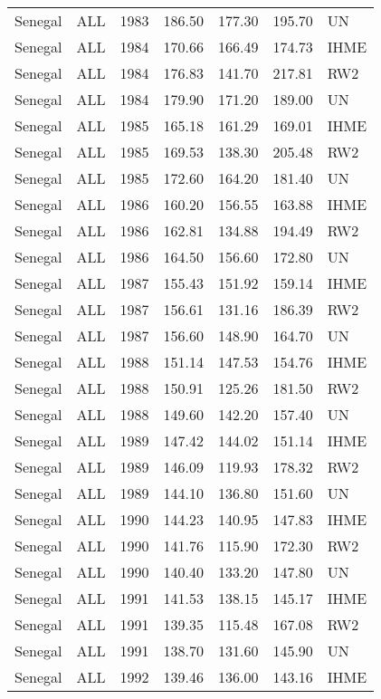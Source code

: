 \begin{longtable}{lllrrrl}
  Senegal & ALL & 1983 & 186.50 & 177.30 & 195.70 & UN \\ 
  Senegal & ALL & 1984 & 170.66 & 166.49 & 174.73 & IHME \\ 
  Senegal & ALL & 1984 & 176.83 & 141.70 & 217.81 & RW2 \\ 
  Senegal & ALL & 1984 & 179.90 & 171.20 & 189.00 & UN \\ 
  Senegal & ALL & 1985 & 165.18 & 161.29 & 169.01 & IHME \\ 
  Senegal & ALL & 1985 & 169.53 & 138.30 & 205.48 & RW2 \\ 
  Senegal & ALL & 1985 & 172.60 & 164.20 & 181.40 & UN \\ 
  Senegal & ALL & 1986 & 160.20 & 156.55 & 163.88 & IHME \\ 
  Senegal & ALL & 1986 & 162.81 & 134.88 & 194.49 & RW2 \\ 
  Senegal & ALL & 1986 & 164.50 & 156.60 & 172.80 & UN \\ 
  Senegal & ALL & 1987 & 155.43 & 151.92 & 159.14 & IHME \\ 
  Senegal & ALL & 1987 & 156.61 & 131.16 & 186.39 & RW2 \\ 
  Senegal & ALL & 1987 & 156.60 & 148.90 & 164.70 & UN \\ 
  Senegal & ALL & 1988 & 151.14 & 147.53 & 154.76 & IHME \\ 
  Senegal & ALL & 1988 & 150.91 & 125.26 & 181.50 & RW2 \\ 
  Senegal & ALL & 1988 & 149.60 & 142.20 & 157.40 & UN \\ 
  Senegal & ALL & 1989 & 147.42 & 144.02 & 151.14 & IHME \\ 
  Senegal & ALL & 1989 & 146.09 & 119.93 & 178.32 & RW2 \\ 
  Senegal & ALL & 1989 & 144.10 & 136.80 & 151.60 & UN \\ 
  Senegal & ALL & 1990 & 144.23 & 140.95 & 147.83 & IHME \\ 
  Senegal & ALL & 1990 & 141.76 & 115.90 & 172.30 & RW2 \\ 
  Senegal & ALL & 1990 & 140.40 & 133.20 & 147.80 & UN \\ 
  Senegal & ALL & 1991 & 141.53 & 138.15 & 145.17 & IHME \\ 
  Senegal & ALL & 1991 & 139.35 & 115.48 & 167.08 & RW2 \\ 
  Senegal & ALL & 1991 & 138.70 & 131.60 & 145.90 & UN \\ 
  Senegal & ALL & 1992 & 139.46 & 136.00 & 143.16 & IHME \\ 

\end{longtable}
